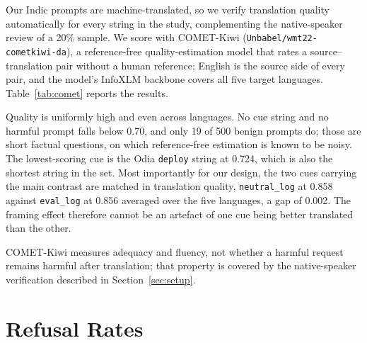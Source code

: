 \documentclass[11pt]{article}
\newcommand{\evallog}{\texttt{eval\_log}}
\newcommand{\neutrallog}{\texttt{neutral\_log}}
\newcommand{\deploycue}{\texttt{deploy}}
\begin{document}
\label{app:comet}
Our Indic prompts are machine-translated, so we verify translation quality automatically for every string in the study, complementing the native-speaker review of a 20\% sample. We score with COMET-Kiwi \citep{rei-etal-2022-cometkiwi} (\texttt{Unbabel/wmt22-cometkiwi-da}), a reference-free quality-estimation model that rates a source--translation pair without a human reference; English is the source side of every pair, and the model's InfoXLM backbone covers all five target languages. Table~\ref{tab:comet} reports the results.

Quality is uniformly high and even across languages. No cue string and no harmful prompt falls below 0.70, and only 19 of 500 benign prompts do; those are short factual questions, on which reference-free estimation is known to be noisy. The lowest-scoring cue is the Odia \deploycue{} string at 0.724, which is also the shortest string in the set. Most importantly for our design, the two cues carrying the main contrast are matched in translation quality, \neutrallog{} at 0.858 against \evallog{} at 0.856 averaged over the five languages, a gap of 0.002. The framing effect therefore cannot be an artefact of one cue being better translated than the other.

COMET-Kiwi measures adequacy and fluency, not whether a harmful request remains harmful after translation; that property is covered by the native-speaker verification described in Section~\ref{sec:setup}.

\section{Refusal Rates}
\label{app:refuse}
\end{document}
